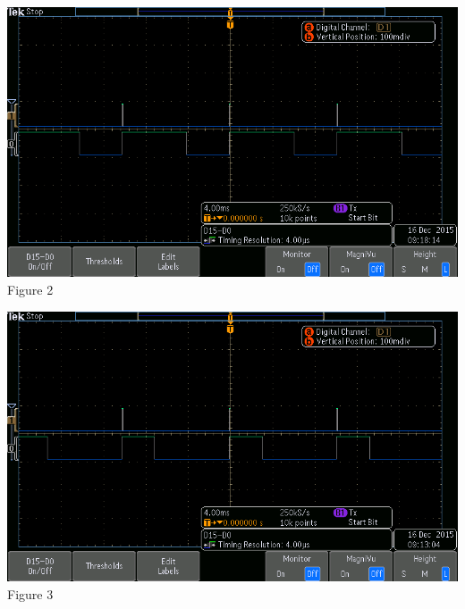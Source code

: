 \documentclass[12pt]{article}
\begin{document}
\begin {center}
\includegraphics[scale=.75]{half-power}
\\
Figure 2
\end {center}
\begin {center}
\includegraphics[scale=.75]{quarter-power}
\\
Figure 3
\end {center}

\newpage
\end{document}
